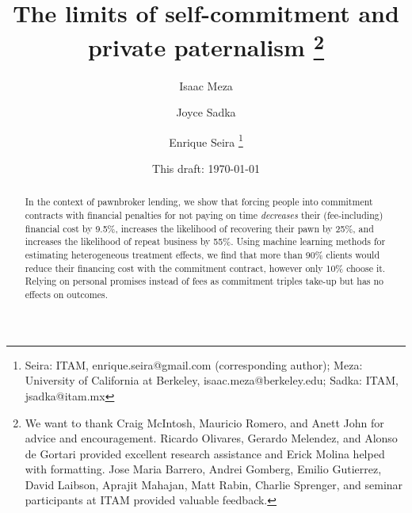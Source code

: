 \documentclass[oneside,11pt]{article}
\begin{document}
\title{The limits of self-commitment and private paternalism \thanks{We want to thank Craig McIntosh, Mauricio Romero, and Anett John for advice and encouragement. Ricardo Olivares, Gerardo Melendez, and Alonso de Gortari provided excellent research assistance and Erick Molina helped with formatting. Jose Maria Barrero, Andrei Gomberg, Emilio Gutierrez, David Laibson, Aprajit Mahajan, Matt Rabin, Charlie Sprenger, and seminar participants at ITAM provided valuable feedback.}}
\author{Isaac Meza \and Joyce Sadka \and Enrique Seira   \thanks{Seira: ITAM, enrique.seira@gmail.com (corresponding author); Meza: University of California at Berkeley, isaac.meza@berkeley.edu; Sadka: ITAM, jsadka@itam.mx} }
\date{This draft:  \today \\[2 cm]}



\maketitle
\thispagestyle{empty}
\begin{abstract}


In the context of pawnbroker lending, we show that forcing people into commitment contracts with financial penalties for not paying on time \textit{decreases} their (fee-including) financial cost by 9.5\%, increases the likelihood of recovering their pawn by 25\%, and increases the likelihood of repeat business by 55\%. Using machine learning methods for estimating heterogeneous treatment effects, we find that more than 90\% clients would reduce their financing cost with the commitment contract, however only 10\% choose it. Relying on personal promises instead of fees as commitment triples take-up but has no effects on outcomes.


\end{abstract}
\end{document}
